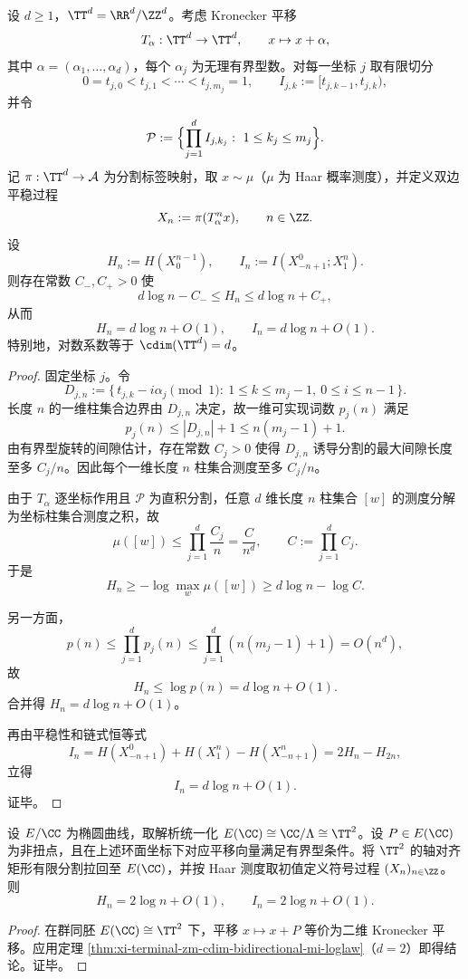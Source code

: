 \begin{theorem}[圆维对双向预测互信息的对数量化律]\label{thm:xi-terminal-zm-cdim-bidirectional-mi-loglaw}
设 \(d\ge 1\)，\(\TT^d=\RR^d/\ZZ^d\)。考虑 Kronecker 平移
\[
T_\alpha:\TT^d\to\TT^d,\qquad x\mapsto x+\alpha,
\]
其中 \(\alpha=(\alpha_1,\dots,\alpha_d)\)，每个 \(\alpha_j\) 为无理有界型数。对每一坐标 \(j\) 取有限切分
\[
0=t_{j,0}<t_{j,1}<\cdots<t_{j,m_j}=1,\qquad
I_{j,k}:=[t_{j,k-1},t_{j,k}),
\]
并令
\[
\mathcal P:=\Bigl\{\prod_{j=1}^d I_{j,k_j}:\ 1\le k_j\le m_j\Bigr\}.
\]
记 \(\pi:\TT^d\to\mathcal A\) 为分割标签映射，取 \(x\sim\mu\)（\(\mu\) 为 Haar 概率测度），并定义双边平稳过程
\[
X_n:=\pi(T_\alpha^n x),\qquad n\in\ZZ.
\]
设
\[
H_n:=H(X_0^{n-1}),\qquad
I_n:=I(X_{-n+1}^{0};X_1^n).
\]
则存在常数 \(C_-,C_+>0\) 使
\[
d\log n-C_-\le H_n\le d\log n+C_+,
\]
从而
\[
H_n=d\log n+O(1),\qquad I_n=d\log n+O(1).
\]
特别地，对数系数等于 \(\cdim(\TT^d)=d\)。
\end{theorem}
\begin{proof}
固定坐标 \(j\)。令
\[
D_{j,n}:=\{\,t_{j,k}-i\alpha_j\!\!\pmod 1:\ 1\le k\le m_j-1,\ 0\le i\le n-1\,\}.
\]
长度 \(n\) 的一维柱集合边界由 \(D_{j,n}\) 决定，故一维可实现词数 \(p_j(n)\) 满足
\[
p_j(n)\le |D_{j,n}|+1\le n(m_j-1)+1.
\]
由有界型旋转的间隙估计，存在常数 \(C_j>0\) 使得 \(D_{j,n}\) 诱导分割的最大间隙长度至多 \(C_j/n\)。因此每个一维长度 \(n\) 柱集合测度至多 \(C_j/n\)。

由于 \(T_\alpha\) 逐坐标作用且 \(\mathcal P\) 为直积分割，任意 \(d\) 维长度 \(n\) 柱集合 \([w]\) 的测度分解为坐标柱集合测度之积，故
\[
\mu([w])\le \prod_{j=1}^d \frac{C_j}{n}=\frac{C}{n^d},
\qquad C:=\prod_{j=1}^d C_j.
\]
于是
\[
H_n\ge -\log\max_w\mu([w])\ge d\log n-\log C.
\]

另一方面，
\[
p(n)\le \prod_{j=1}^d p_j(n)\le \prod_{j=1}^d (n(m_j-1)+1)=O(n^d),
\]
故
\[
H_n\le \log p(n)=d\log n+O(1).
\]
合并得 \(H_n=d\log n+O(1)\)。

再由平稳性和链式恒等式
\[
I_n=H(X_{-n+1}^{0})+H(X_1^n)-H(X_{-n+1}^{n})
=2H_n-H_{2n},
\]
立得
\[
I_n=d\log n+O(1).
\]
证毕。
\end{proof}

\begin{corollary}\label{cor:xi-terminal-zm-elliptic-complex-torus-mi-loglaw}
设 \(E/\CC\) 为椭圆曲线，取解析统一化 \(E(\CC)\cong \CC/\Lambda\cong \TT^2\)。设 \(P\in E(\CC)\) 为非扭点，且在上述环面坐标下对应平移向量满足有界型条件。将 \(\TT^2\) 的轴对齐矩形有限分割拉回至 \(E(\CC)\)，并按 Haar 测度取初值定义符号过程 \((X_n)_{n\in\ZZ}\)。则
\[
H_n=2\log n+O(1),\qquad I_n=2\log n+O(1).
\]
\end{corollary}
\begin{proof}
在群同胚 \(E(\CC)\cong\TT^2\) 下，平移 \(x\mapsto x+P\) 等价为二维 Kronecker 平移。应用定理 \ref{thm:xi-terminal-zm-cdim-bidirectional-mi-loglaw}（\(d=2\)）即得结论。证毕。
\end{proof}

